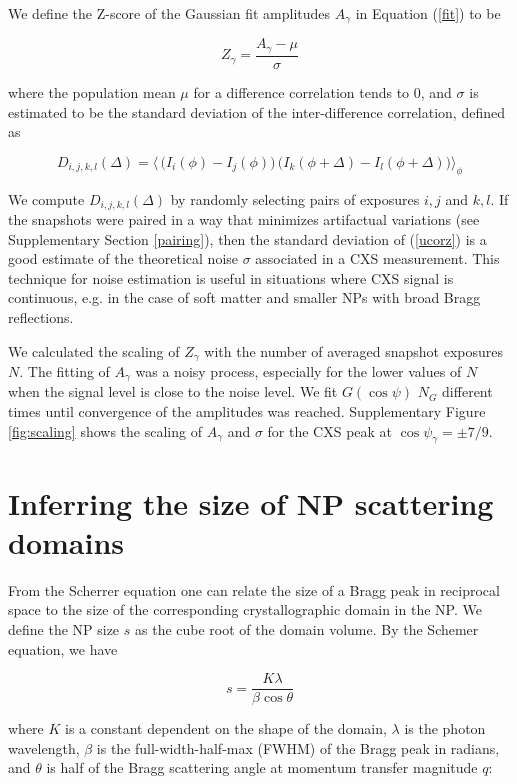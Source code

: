 \documentclass [12pt,fleqn]{article}
\def \be {\begin{equation}}
\def \ee {\end{equation}}
\begin{document}
We define the Z-score of the Gaussian fit amplitudes $A_\gamma$ in Equation (\ref{fit}) to be

\be
Z_\gamma = \frac {A_\gamma  - \mu }{\sigma}
\ee

where the population mean $\mu$ for a difference correlation tends to $0$, and  $\sigma$ is estimated to be the standard deviation of the inter-difference correlation, defined as  

\be \label{ucorz}
D_{i,j,k,l}(\Delta) =\big
 \langle  \,\big(  I_i(\phi)-I_j(\phi) \big)\,\big( I_k( \phi + \Delta) - I_l( \phi+\Delta) \big) \big \rangle _{\phi}
\ee

We compute $D_{i,j,k,l}(\Delta)$  by randomly selecting pairs of exposures $i,j$ and $k,l$. If the snapshots were paired in a way that minimizes artifactual variations (see Supplementary Section \ref{pairing}), then the standard deviation of (\ref{ucorz}) is a good estimate of the theoretical noise $\sigma$ associated in a CXS measurement. This technique for noise estimation is useful in situations where CXS signal is continuous, e.g. in the case of soft matter and smaller NPs with broad Bragg reflections.

We calculated the scaling of $Z_\gamma$ with the number of averaged snapshot exposures $N$. The fitting of $A_\gamma$ was a noisy process, especially for the lower values of $N$ when the signal level is close to the noise level. We fit $G(\cos \psi)$ $N_G$ different times until convergence of the amplitudes was reached. Supplementary Figure \ref{fig:scaling} shows the scaling of $A_\gamma$ and $\sigma$ for the CXS peak at $\cos \psi_\gamma = \pm 7/9$.

\section{Inferring the size of NP scattering domains} \label{widths}
From the Scherrer equation \cite{scherrer1969bestimmung} one can relate the size of a Bragg peak in reciprocal space to the size of the corresponding crystallographic domain in the NP. We define the NP size $s$ as the cube root of the domain volume. By the Schemer equation, we have 

\be \label{scherrer}
s = \frac{K \lambda}{\beta \cos \theta}
\ee 

where $K$ is a constant dependent on the shape of the domain, $\lambda$ is the photon wavelength, $\beta$ is the full-width-half-max (FWHM) of the Bragg peak in radians, and $\theta$ is half of the Bragg scattering angle at momentum transfer magnitude $q$:
\end{document}
